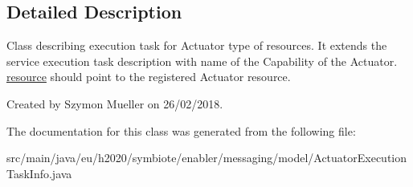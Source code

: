 \subsection{Detailed Description}
Class describing execution task for Actuator type of resources. It extends the service execution task description with name of the Capability of the Actuator. \hyperlink{}{resource} should point to the registered Actuator resource.

Created by Szymon Mueller on 26/02/2018. 

The documentation for this class was generated from the following file\+:\begin{DoxyCompactItemize}
\item 
src/main/java/eu/h2020/symbiote/enabler/messaging/model/Actuator\+Execution\+Task\+Info.\+java\end{DoxyCompactItemize}
